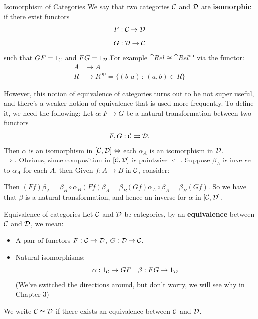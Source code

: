 \documentclass{article}
\begin{document}
\begin{fancydefine}{Isomorphism of Categories}
    We say that two categories $\mathcal{C}$ and $\mathcal{D}$ are \textbf{isomorphic} if there exist functors \[ F: \mathcal{C} \to \mathcal{D} \] \[ G: \mathcal{D} \to \mathcal{C}\] such that $GF=1_{\mathcal{C}}$ and $FG=1_{\mathcal{D}}$.\gap For example $\cat{Rel} \cong \cat{Rel}^{\text{op}}$ via the functor: \begin{align*}
        A &\mapsto A\\
        R &\mapsto R^{\text{op}} = \{(b,a) \, : \, (a,b) \in R\}
    \end{align*}
\end{fancydefine}
However, this notion of equivalence of categories turns out to be not super useful, and there's a weaker notion of equivalence that is used more frequently. To define it, we need the following:
\lem Let $\alpha : F \to G$ be a natural transformation between two functors \[ F, G : \mathcal{C} \rightrightarrows \mathcal{D}. \] Then $\alpha$ is an isomorphism in $[\mathcal{C}, \mathcal{D}] \Leftrightarrow $ each $\alpha_{A}$ is an isomorphism in $\mathcal{D}$.
\proof \hspace{0.1cm} \\
$\Rightarrow$: Obvious, since composition in $[\mathcal{C}, \mathcal{D}]$ is pointwise \gap 
$\Leftarrow$: Suppose $\beta_{A}$ is inverse to $\alpha_{A}$ for each $A$, then Given $f: A \to B$ in $\mathcal{C}$, consider:

\begin{center}
\end{center}
Then $(Ff)\beta_{A} = \beta_{B} \circ \alpha_{B} (Ff)\beta_{A} = \beta_{B}(Gf)\alpha_{A} \circ \beta_{A}=\beta_{B}(Gf).$ So we have that $\beta$ is a natural transformation, and hence an inverse for $\alpha$ in $[\mathcal{C}, \mathcal{D}]$. \endproof
\begin{fancydefine}{Equivalence of categories}
    Let $\mathcal{C}$ and $\mathcal{D}$ be categories, by an \textbf{equivalence} between $\mathcal{C}$ and $\mathcal{D}$, we mean:
    \begin{itemize}
        \item A pair of functors $F: \mathcal{C} \to \mathcal{D}$, $G : \mathcal{D} \to \mathcal{C}$.
        \item Natural isomorphisms: \begin{align*}
            \alpha : 1_{\mathcal{C}} \to GF & & \beta : FG \to 1_{\mathcal{D}}
        \end{align*}
        (We've switched the directions around, but don't worry, we will see why in Chapter 3)
    \end{itemize}
    We write $\mathcal{C} \simeq \mathcal{D}$ if there exists an equivalence between $\mathcal{C}$ and $\mathcal{D}$.
    
\end{fancydefine}
\end{document}
